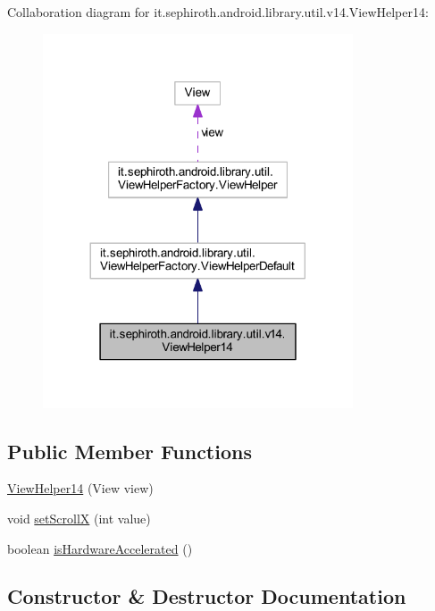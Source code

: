 Collaboration diagram for it.\+sephiroth.\+android.\+library.\+util.\+v14.\+View\+Helper14\+:
\nopagebreak
\begin{figure}[H]
\begin{center}
\leavevmode
\includegraphics[width=260pt]{classit_1_1sephiroth_1_1android_1_1library_1_1util_1_1v14_1_1_view_helper14__coll__graph}
\end{center}
\end{figure}
\subsection*{Public Member Functions}
\begin{DoxyCompactItemize}
\item 
\hyperlink{classit_1_1sephiroth_1_1android_1_1library_1_1util_1_1v14_1_1_view_helper14_a4aec967f2bf0256a37dbd6157a631c06}{View\+Helper14} (View view)
\item 
void \hyperlink{classit_1_1sephiroth_1_1android_1_1library_1_1util_1_1v14_1_1_view_helper14_a03bf166058a619d1eea7411b3a1ac85f}{set\+ScrollX} (int value)
\item 
boolean \hyperlink{classit_1_1sephiroth_1_1android_1_1library_1_1util_1_1v14_1_1_view_helper14_a1b920d94099c53e2154f6a9de5d18eb3}{is\+Hardware\+Accelerated} ()
\end{DoxyCompactItemize}


\subsection{Constructor \& Destructor Documentation}
\mbox{\label{classit_1_1sephiroth_1_1android_1_1library_1_1util_1_1v14_1_1_view_helper14_a4aec967f2bf0256a37dbd6157a631c06}} 
